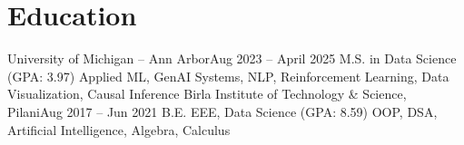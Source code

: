 

\section{Education}
\vspace{-10pt}
\resumeSubheadingEducation
  {University of Michigan – Ann Arbor}{Aug 2023 -- April 2025}
  {M.S. in Data Science (GPA: 3.97)}
  {Applied ML, GenAI Systems, NLP,  Reinforcement Learning, Data Visualization, Causal Inference}
\vspace{2pt}
\resumeSubheadingEducation
  {Birla Institute of Technology \& Science, Pilani}{Aug 2017 -- Jun 2021}
  {B.E. EEE, Data Science (GPA: 8.59)}
  {OOP, DSA, Artificial Intelligence, Algebra, Calculus}
